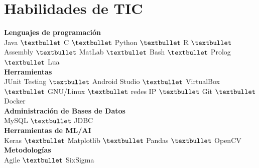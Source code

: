 \documentclass[letterpaper]{twentysecondcv} %
\begin{document}
\section{Habilidades de TIC}
\textbf{Lenguajes de programación}\\
\vspace{5pt}
Java $\textbullet$ C $\textbullet$ Python $\textbullet$ R $\textbullet$ Assembly $\textbullet$ MatLab $\textbullet$ Bash $\textbullet$ Prolog $\textbullet$ Lua\\
\textbf{Herramientas}\\
\vspace{5pt}
JUnit Testing $\textbullet$ Android Studio $\textbullet$ VirtualBox $\textbullet$ GNU/Linux $\textbullet$ redes IP $\textbullet$ Git $\textbullet$ Docker\\
\textbf{Administración de Bases de Datos}\\
\vspace{5pt}
MySQL $\textbullet$ JDBC\\
\textbf{Herramientas de ML/AI}\\
\vspace{5pt}
Keras $\textbullet$ Matplotlib $\textbullet$ Pandas $\textbullet$ OpenCV\\
\textbf{Metodologías}\\
Agile $\textbullet$ SixSigma\\
\end{document}
